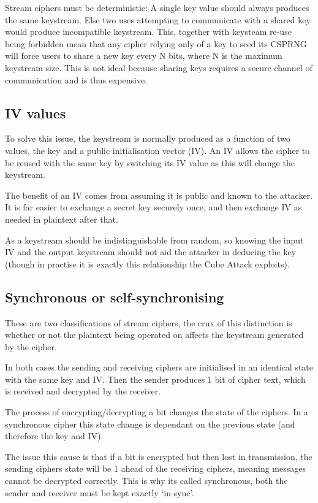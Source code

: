 \documentclass{report}
\let\Oldsubsection\subsection
\renewcommand{\subsection}{\FloatBarrier\Oldsubsection}
\begin{document}
Stream ciphers must be deterministic: A single key value should always produces the same keystream. Else two uses attempting to communicate with a shared key would produce incompatible keystream. This, together with keysteam re-use being forbidden mean that any cipher relying only of a key to seed its CSPRNG will force users to share a new key every N bits, where N is the maximum keystream size. This is not ideal because sharing keys requires a secure channel of communication and is thus expensive.

\subsection*{IV values}
To solve this issue, the keystream is normally produced as a function of two values, the key and a public initialisation vector (IV). An IV allows the cipher to be reused with the same key by switching its IV value as this will change the keystream.

The benefit of an IV comes from assuming it is public and known to the attacker. It is far easier to exchange a secret key securely once, and then exchange IV as needed in plaintext after that.

As a keystream should be indistinguishable from random, so knowing the input IV and the output keystream should not aid the attacker in deducing the key (though in practise it is exactly this relationship the Cube Attack exploits).

\subsection{Synchronous or self-synchronising}
These are two classifications of stream ciphers, the crux of this distinction is whether or not the plaintext being operated on affects the keystream generated by the cipher.

In both cases the sending and receiving ciphers are initialised in an identical state with the same key and IV. Then the sender produces 1 bit of cipher text, which is received and decrypted by the receiver.

The process of encrypting/decrypting a bit changes the state of the ciphers. In a synchronous cipher this state change is dependant on the previous state (and therefore the key and IV).

The issue this cause is that if a bit is encrypted but then lost in transmission, the sending ciphers state will be 1 ahead of the receiving ciphers, meaning messages cannot be decrypted correctly. This is why its called synchronous, both the sender and receiver must be kept exactly `in sync'.
\end{document}

